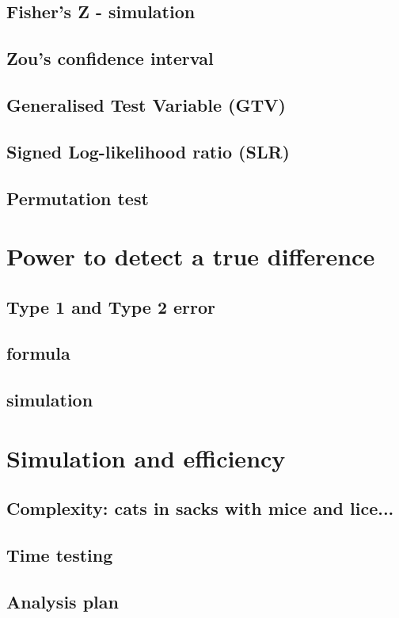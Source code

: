 \documentclass{beamer}
\begin{document}
  \subsection{Fisher's Z - simulation}
  \subsection{Zou's confidence interval}
  \subsection{Generalised Test Variable (GTV)}
  \subsection{Signed Log-likelihood ratio (SLR)}
  \subsection{Permutation test}
  
  \section{Power to detect a true difference}
  \subsection{Type 1 and Type 2 error}
  \subsection{formula}
  \subsection{simulation}
  
  \section{Simulation and efficiency}
  \subsection{Complexity: cats in sacks with mice and lice...}
  \subsection{Time testing}
  \subsection{Analysis plan}
  
\end{document}
